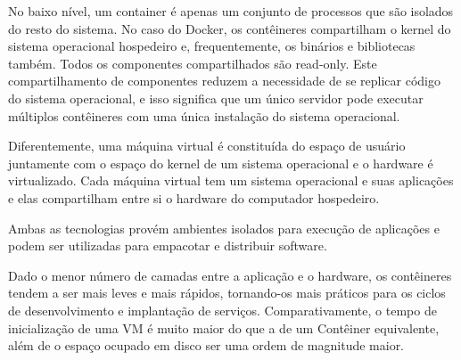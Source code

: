 \documentclass[]{politex}
\begin{document}
	No baixo nível, um container é apenas um conjunto de processos que são isolados do resto do sistema. No caso do Docker, os contêineres compartilham o kernel do sistema operacional hospedeiro e, frequentemente, os binários e bibliotecas também. Todos os componentes compartilhados são read-only. Este compartilhamento de componentes reduzem a necessidade de se replicar código do sistema operacional, e isso significa que um único servidor pode executar múltiplos contêineres com uma única instalação do sistema operacional.

	Diferentemente, uma máquina virtual é constituída do espaço de usuário juntamente com o espaço do kernel de um sistema operacional e o hardware é virtualizado. Cada máquina virtual tem um sistema operacional e suas aplicações e elas compartilham entre si o hardware do computador hospedeiro.

	Ambas as tecnologias provém ambientes isolados para execução de aplicações e podem ser utilizadas para empacotar e distribuir software.

	Dado o menor número de camadas entre a aplicação e o hardware,  os contêineres tendem a ser mais leves e mais rápidos, tornando-os mais práticos para os ciclos de desenvolvimento e implantação de serviços. Comparativamente, o tempo de inicialização de uma VM é muito maior do que a de um Contêiner equivalente, além de o espaço ocupado em disco ser uma ordem de magnitude maior.
	
\end{document}
